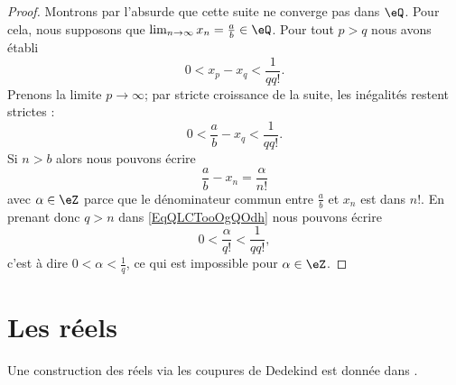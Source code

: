 \begin{proof}
    Montrons par l'absurde que cette suite ne converge pas dans \( \eQ\). Pour cela, nous supposons que \( \lim_{n\to \infty} x_n=\frac{ a }{b }\in \eQ\). Pour tout \( p>q\) nous avons établi
    \begin{equation}
        0<x_p-x_q<\frac{1}{ qq! }.
    \end{equation}
    Prenons la limite \( p\to \infty\); par stricte croissance de la suite, les inégalités restent strictes :
    \begin{equation}        \label{EqQLCTooOgQOdh}
        0<\frac{ a }{ b }-x_q<\frac{1}{ qq! }.
    \end{equation}
    Si \( n>b\) alors nous pouvons écrire
    \begin{equation}
        \frac{ a }{ b }-x_n=\frac{ \alpha }{ n! }
    \end{equation}
    avec \( \alpha\in \eZ\) parce que le dénominateur commun entre \( \frac{ a }{ b }\) et \( x_n\) est dans \( n!\). En prenant donc \( q>n\) dans \eqref{EqQLCTooOgQOdh} nous pouvons écrire
    \begin{equation}
        0<\frac{ \alpha }{ q! }<\frac{1}{ qq! },
    \end{equation}
    c'est à dire \( 0<\alpha<\frac{1}{ q }\), ce qui est impossible pour \( \alpha\in \eZ\).
\end{proof}

\section{Les réels}

Une construction des réels via les coupures de Dedekind est donnée dans \cite{PaulinTopGmVegN}.

